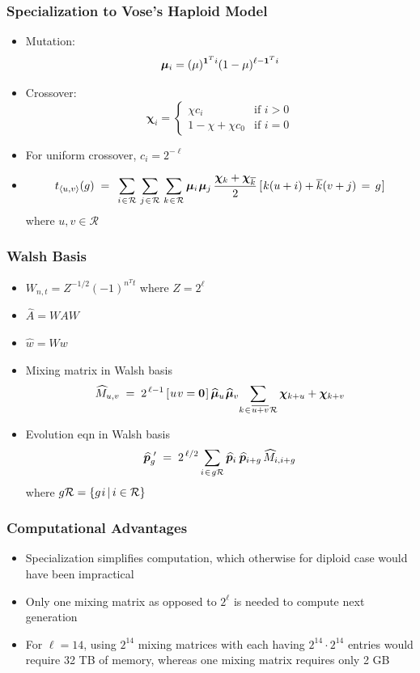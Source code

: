 \documentclass[aspectratio=169]{beamer}
\newcommand{\nudge}{\hspace{0.01in}}
\begin{document}
  \begin{frame}
    \frametitle{Specialization to Vose's Haploid Model}
    \begin{itemize}
      \item{Mutation: \[\bm{\mu}_i = (\mu)^{{\bf 1}^Ti} (1-\mu)^{\ell- {\bf 1}^Ti} \]}
      \item{Crossover: \[
	\bm{\chi}_i =\begin{cases}
	  \chi c_i & \text{if $i>0$}\\
	  1 - \chi + \chi  c_0 & \text{if $i = 0$}
	\end{cases}
      \]}
      \item{For uniform crossover, $c_i = 2^{-\ell}$}
      \item{\[ t_{\langle u,v \rangle}(g) \; = \;\,
      \sum_{i \nudge \in \nudge \mathcal{R}} \, \sum_{j \nudge \in \nudge \mathcal{R}} \,
      \sum_{k \nudge \in \nudge \mathcal{R}}
      \bm{\mu}_i \nudge \bm{\mu}_j \, \frac{\bm{\chi}_k + \bm{\chi}_{\overline{k}}}{2} \,
      [\nudge k (u + i) + \overline{k}(v + j) \, = \, g\nudge] \] where $u,v \in \mathcal{R}$}
      
    \end{itemize}
  \end{frame}
  
  \begin{frame}
    \frametitle{Walsh Basis}
    \begin{itemize}
	\item{$W_{n,t} = Z^{-1/2} (-1)^{n^T t}$ where $Z = 2^\ell$}
	\item{$\widehat{A} = WAW$}
	\item{$\widehat{w} = Ww$}
	\item{Mixing matrix in Walsh basis 
	\[
	  \widehat{M}_{u,v} \; = \; 2^{\,\ell-1} \,[\nudge u \nudge v = {\bf
	  0}\nudge]\, \widehat{\bm{\mu}}_u \nudge \widehat{\bm{\mu}}_v \!  \sum_{k
	\nudge \in \nudge \overline{u+v} \nudge \mathcal{R}} \bm{\chi}_{k + u} +
	\bm{\chi}_{k + v}
	\]
	}
	\item{Evolution eqn in Walsh basis 
	\[
	  \widehat{\bm{p}}_g^{\,\,\prime} \; = \; 2^{\,\ell/2} \sum_{i \nudge \in \nudge g \mathcal{R}}
	  \widehat{\bm{p}}_i \, \nudge \widehat{\bm{p}}_{i+g} \,\widehat{M}_{i,i+g}
	\]
	 where $g \mathcal{R} = \{g \nudge i \, | \, i \in \mathcal{R} \}$
	}
    \end{itemize}
  \end{frame}
  
  \begin{frame}
    \frametitle{Computational Advantages}
    \begin{itemize}
      \item{Specialization simplifies computation, which otherwise for diploid case would have been impractical} 
      \item{Only one mixing matrix as opposed to $2^\ell$ is needed to compute next generation}
      \item{For $\ell = 14$, using $2^{14}$ mixing matrices with each having $2^{14} \cdot 2^{14}$ 
      entries would require 32 TB of memory, whereas one mixing matrix requires only 2 GB}
    \end{itemize}
  \end{frame}
  
\end{document}
